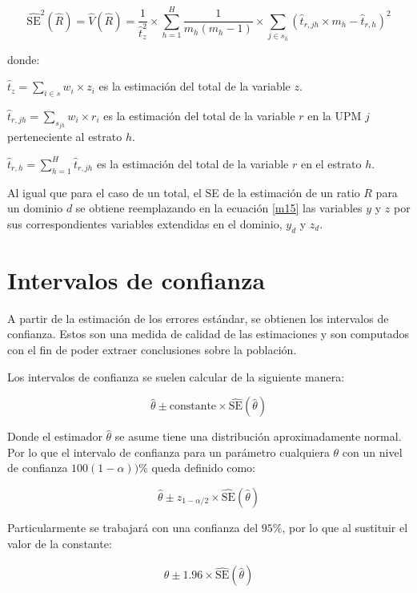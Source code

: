 \documentclass[12pt,twoside,spanish,a4paper]{book}\usepackage[]{graphicx}\usepackage[]{color}
\begin{document}
\begin{equation}
\widehat {\text{SE}}^2(\hat R)=\hat V (\hat R)= \frac{1}{\hat t_z^2}\times\sum\limits_{h=1}^H\frac{1}{m_h(m_h-1)}\times \sum\limits_{j \in s_h}(\hat t_{r,jh}\times m_h-\hat t_{r,h})^2
\label{m15}
\end{equation}

donde:

$\hat t_z=\sum\nolimits_{i\in s}w_i\times z_i$ es la estimación del total de la variable $z$.

$\hat t_{r,jh}=\sum\nolimits_{s_{jh}} w_i\times r_i$ es la estimación del total de la variable $r$ en la UPM $j$ perteneciente al estrato $h$.

$\hat t_{r,h}=\sum\nolimits_{h=1}^H\hat t_{r,jh}$ es la estimación del total de la variable $r$ en el estrato $h$.

Al igual que para el caso de un total, el SE de la estimación de un ratio $R$ para un dominio $d$ se obtiene reemplazando en la ecuación \ref{m15} las variables $y$ y $z$ por sus correspondientes variables extendidas en el dominio, $y_d$ y $z_d$.

\section{Intervalos de confianza \label{sec:ic}}

A partir de la estimación de los errores estándar, se obtienen los intervalos de confianza. Estos son una medida de calidad de las estimaciones y son computados con el fin de poder extraer conclusiones sobre la población.

Los intervalos de confianza se suelen calcular de la siguiente manera:

\[ \hat \theta \pm \text{constante}\times \widehat{\text{SE}}(\hat \theta) \]

Donde el estimador $\hat \theta$ se asume tiene una distribución aproximadamente normal. Por lo que el intervalo de confianza para un parámetro cualquiera $\theta$ con un nivel de confianza $100(1-\alpha))\%$ queda definido como:

\[ \hat \theta \pm z_{1-\alpha/2}\times \widehat{\text{SE}}(\hat \theta) \]

Particularmente se trabajará con una confianza del $95\%$, por lo que al sustituir el valor de la constante:

\begin{equation}\label{m18}
\begin{array}{cc}
\hat \theta \pm 1.96\times \widehat{\text{SE}}(\hat \theta)
\end{array}
\end{equation}
\end{document}
